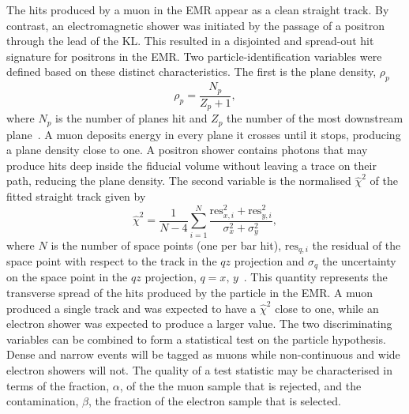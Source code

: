 The hits produced by a muon in the EMR appear as a clean straight
track.
By contrast, an electromagnetic shower was initiated by the passage of
a positron through the lead of the KL.
This resulted in a disjointed and spread-out hit signature for
positrons in the EMR.
Two particle-identification variables were defined based on these
distinct characteristics.
The first is the plane density, $\rho_p$
\begin{equation}
  \rho_p = \frac{N_p}{Z_p+1},
\end{equation}
where $N_p$ is the number of planes hit and $Z_p$ the number of the
most downstream plane~\cite{2015JInst..10P2012A}.
A muon deposits energy in every plane it crosses until it stops,
producing a plane density close to one.
A positron shower contains photons that may produce hits deep inside
the fiducial volume without leaving a trace on their path, reducing
the plane density.
The second variable is the normalised $\hat{\chi}^2$ of the fitted
straight track given by
\begin{equation}
  \hat{\chi}^2=\frac{1}{N-4}\sum_{i=1}^{N}\frac{\text{res}_{x,i}^2+\text{res}_{y,i}^2}{\sigma_x^2+\sigma_y^2},
\end{equation}
where $N$ is the number of space points (one per bar hit),
$\text{res}_{q,i}$ the residual of the space point with respect to the
track in the $qz$ projection and $\sigma_q$ the uncertainty on the
space point in the $qz$ projection, $q=x,\,y$~\cite{Drielsma:thesis}.
This quantity represents the transverse spread of the hits produced by
the particle in the EMR.
A muon produced a single track and was expected to have a
$\hat{\chi}^2$ close to one, while an electron shower was expected to
produce a larger value.
The two discriminating variables can be combined to form a statistical
test on the particle hypothesis. 
Dense and narrow events will be tagged as muons while non-continuous
and wide electron showers will not.  
The quality of a test statistic may be characterised in terms of the
fraction, $\alpha$, of the the muon sample that is rejected, and the 
contamination, $\beta$, the fraction of the electron sample that is
selected. 


